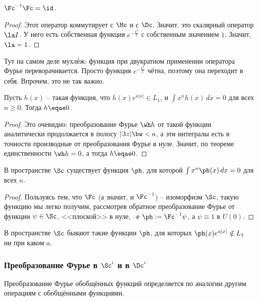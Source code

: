 \documentclass[a4paper]{article}
\newcommand{\dx}{\,dx}
\begin{document}
\begin{imp}
$\Fc^{-1}\Fc = \id$.
\end{imp}
\begin{proof}
Этот оператор коммутирует с $\Mc$ и с $\Dc$. Значит, это скалярный оператор $\la I$.
У него есть собственная функция $e^{-\frac{x^2}{2}}$ с собственным значением $1$. Значит, $\la =1$.
\end{proof}

\begin{petit}
Тут на самом деле мухлёж: функция при двукратном применении оператора Фурье переворачивается.
Просто функция $e^{-\frac{x^2}{2}}$ чётна, поэтому она переходит в себя. Впрочем, это не так важно.
\end{petit}

\begin{stm}
Пусть $h(x)$ -- такая функция, что $h(x)e^{a|x|}\in L_1$, и $\int x^n h(x)\dx=0$ для
всех $n \ge0$. Тогда $h\eqae 0$.
\end{stm}
\begin{proof}
Это очевидно: преобразование Фурье $\wh h$ от такой функции аналитически
продолжается в полосу $|\Im z| \bw< a$, а эти интегралы есть в точности производные
от преобразования Фурье в нуле. Значит, по теореме единственности $\wh h =0$, а тогда $h\eqae 0$.
\end{proof}

\begin{stm}
В пространстве $\Sc$ существует функция $\ph$, для которой $\int x^n\ph(x)\dx=0$ для всех $n$.
\end{stm}
\begin{proof}
Пользуясь тем, что $\Fc$ (а значит, и $\Fc^{-1}$) -- изоморфизм $\Sc$, такую функцию мы легко получим,
рассмотрев обратное преобразование Фурье от функции $\psi\in\Sc$, <<плоской>> в нуле,  --е $\ph := \Fc^{-1}\psi$,
а $\psi \equiv 1$ в $U(0)$.
\end{proof}
\begin{imp}
В пространстве $\Sc$ бывают такие функции $\ph$, для которых $\ph(x)e^{a|x|}\notin L_1$ ни при каком $a$.
\end{imp}

\subsubsection{Преобразование Фурье в $\Sc'$ и в $\Dc'$}

Преобразование Фурье обобщённых функций определяется по аналогии другим операциям с обобщёнными функциями.
\end{document}
